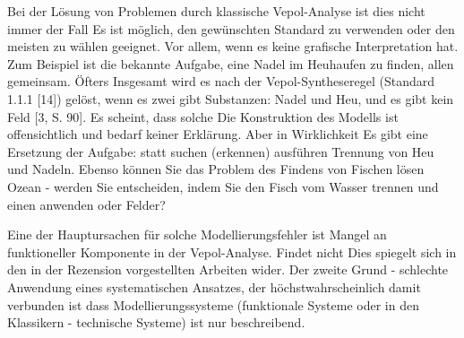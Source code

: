 \documentclass[11pt,a4paper]{article}
\begin{document}
Bei der Lösung von Problemen durch klassische Vepol-Analyse ist dies nicht
immer der Fall Es ist möglich, den gewünschten Standard zu verwenden oder den
meisten zu wählen geeignet. Vor allem, wenn es keine grafische Interpretation
hat.  Zum Beispiel ist die bekannte Aufgabe, eine Nadel im Heuhaufen zu
finden, allen gemeinsam. Öfters Insgesamt wird es nach der Vepol-Syntheseregel
(Standard 1.1.1 [14]) gelöst, wenn es zwei gibt Substanzen: Nadel und Heu, und
es gibt kein Feld [3, S. 90]. Es scheint, dass solche Die Konstruktion des
Modells ist offensichtlich und bedarf keiner Erklärung. Aber in Wirklichkeit
Es gibt eine Ersetzung der Aufgabe: statt suchen (erkennen) ausführen Trennung
von Heu und Nadeln. Ebenso können Sie das Problem des Findens von Fischen
lösen Ozean - werden Sie entscheiden, indem Sie den Fisch vom Wasser trennen
und einen anwenden oder Felder?

Eine der Hauptursachen für solche Modellierungsfehler ist Mangel an
funktioneller Komponente in der Vepol-Analyse. Findet nicht Dies spiegelt sich
in den in der Rezension vorgestellten Arbeiten wider. Der zweite Grund -
schlechte Anwendung eines systematischen Ansatzes, der höchstwahrscheinlich
damit verbunden ist dass Modellierungssysteme (funktionale Systeme oder in den
Klassikern - technische Systeme) ist nur beschreibend.
\end{document}
